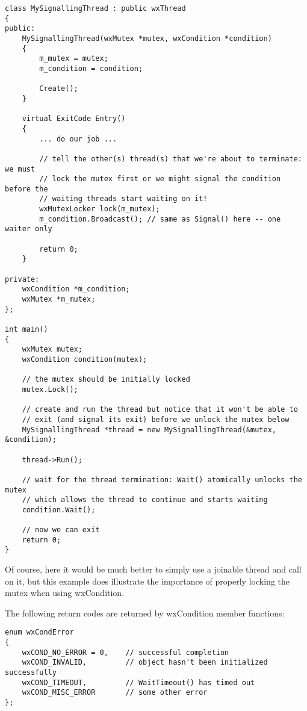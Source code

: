 \begin{verbatim}
class MySignallingThread : public wxThread
{
public:
    MySignallingThread(wxMutex *mutex, wxCondition *condition)
    {
        m_mutex = mutex;
        m_condition = condition;

        Create();
    }

    virtual ExitCode Entry()
    {
        ... do our job ...

        // tell the other(s) thread(s) that we're about to terminate: we must
        // lock the mutex first or we might signal the condition before the
        // waiting threads start waiting on it!
        wxMutexLocker lock(m_mutex);
        m_condition.Broadcast(); // same as Signal() here -- one waiter only

        return 0;
    }

private:
    wxCondition *m_condition;
    wxMutex *m_mutex;
};

int main()
{
    wxMutex mutex;
    wxCondition condition(mutex);

    // the mutex should be initially locked
    mutex.Lock();

    // create and run the thread but notice that it won't be able to
    // exit (and signal its exit) before we unlock the mutex below
    MySignallingThread *thread = new MySignallingThread(&mutex, &condition);

    thread->Run();

    // wait for the thread termination: Wait() atomically unlocks the mutex
    // which allows the thread to continue and starts waiting
    condition.Wait();

    // now we can exit
    return 0;
}
\end{verbatim}

Of course, here it would be much better to simply use a joinable thread and
call  on it, but this example does
illustrate the importance of properly locking the mutex when using
wxCondition.


The following return codes are returned by wxCondition member functions:

\begin{verbatim}
enum wxCondError
{
    wxCOND_NO_ERROR = 0,    // successful completion
    wxCOND_INVALID,         // object hasn't been initialized successfully
    wxCOND_TIMEOUT,         // WaitTimeout() has timed out
    wxCOND_MISC_ERROR       // some other error
};
\end{verbatim}

